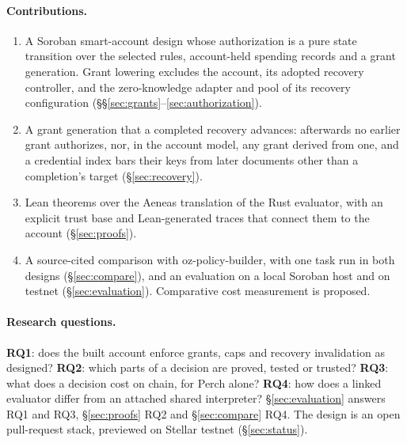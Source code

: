 \paragraph{Contributions.}
\begin{enumerate}[nosep,leftmargin=*]
\item A Soroban smart-account design whose authorization is a pure state
  transition over the selected rules, account-held spending records and a grant
  generation. Grant lowering excludes the account, its adopted recovery
  controller, and the zero-knowledge adapter and pool of its recovery
  configuration (\S\S\ref{sec:grants}--\ref{sec:authorization}).
\item A grant generation that a completed recovery advances: afterwards no earlier
  grant authorizes, nor, in the account model, any grant derived from one, and a
  credential index bars their keys from later documents other than a completion's
  target (\S\ref{sec:recovery}).
\item Lean theorems over the Aeneas translation of the Rust evaluator, with an
  explicit trust base and  Lean-generated traces that
  connect them to the account (\S\ref{sec:proofs}).
\item A source-cited comparison with oz-policy-builder, with one task run in both
  designs (\S\ref{sec:compare}), and an evaluation on a local Soroban host and on
  testnet (\S\ref{sec:evaluation}). Comparative cost measurement is proposed.
\end{enumerate}

\paragraph{Research questions.} \textbf{RQ1}: does the built account enforce
grants, caps and recovery invalidation as designed? \textbf{RQ2}: which parts of
a decision are proved, tested or trusted? \textbf{RQ3}: what does a decision cost
on chain, for Perch alone? \textbf{RQ4}: how does a linked evaluator differ from
an attached shared interpreter? \S\ref{sec:evaluation} answers RQ1 and RQ3,
\S\ref{sec:proofs} RQ2 and \S\ref{sec:compare} RQ4. The design is an open
pull-request stack, previewed on Stellar testnet (\S\ref{sec:status}).
